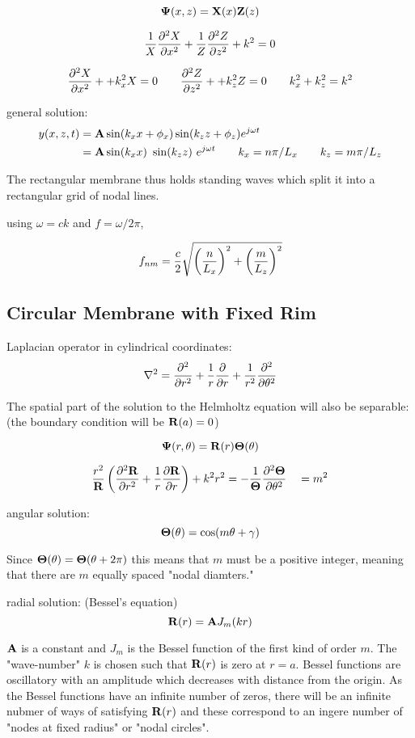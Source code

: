 \documentclass[10pt, a4paper, twocolumn]{article}
\begin{document}
\[ \vb \Psi (x,z) = \vb X (x) \vb Z (z) \] 

\[ \frac1X \pdv[2]{X}{x} + \frac1Z \pdv[2]{Z}{z} + k^2 = 0 \]

\[ \pdv[2]{X}{x} + + k_x^2 X = 0 \qquad \pdv[2]{Z}{z} + + k_z^2 Z = 0 \qquad k_x^2 + k_z^2 = k^2
\]

general solution:
\begin{equation*}
\begin{aligned}
y(x,z,t) &= \vb A \sin (k_x x + \phi _x )
\sin (k_z z + \phi _z ) e^{j \omega t}
\\ &= \vb A \sin (k_x x) \ \sin (k_z z) \ e^{j \omega t}
\qquad k_x = n \pi /L_x \qquad k_z = m \pi / L_z
\end{aligned}
\end{equation*}

The rectangular membrane thus holds standing waves which split it into a rectangular grid of nodal lines.

using $\omega = ck$ and $f = \omega/2 \pi $,

\[ f_{nm} = \frac{c}{2} \sqrt{ \qty(\frac{n}{L_x})^2 +
\qty(\frac{m}{L_z})^2 } \]

\subsection{Circular Membrane with Fixed Rim}

Laplacian operator in cylindrical coordinates:
\[ \laplacian = \pdv[2]{r} + \frac1r \pdv{r} +
\frac{1}{r^2} \pdv[2]{\theta} \]

The spatial part of the solution to the Helmholtz equation will also be separable: (the boundary condition will be $\vb R (a) = 0$)

\[ \vb \Psi (r, \theta) = \vb R (r) \vb \Theta (\theta) \]

\[ \frac{r^2}{\vb R}
\left( \pdv[2]{\vb R}{r} + \frac1r \pdv{\vb R}{r} \right)
+ k^2 r^2
= - \frac{1}{\vb \Theta} \pdv[2]{\vb \Theta}{\theta}
\quad = m^2 \]

angular solution:
\[ \vb \Theta (\theta ) = \cos (m \theta + \gamma ) \]

Since $ \vb \Theta (\theta ) = \vb \Theta (\theta + 2 \pi)$ this means that $m$ must be a positive integer, meaning that there are $m$ equally spaced "nodal diamters."

radial solution: \quad (Bessel's equation)
\[ \vb R (r) = \vb A J_m (kr) \]

$ \vb A $ is a constant and $J_m$ is the Bessel function of the first kind of order $m$. The "wave-number" $k$ is chosen such that $\vb R (r) $ is zero at $r=a$. Bessel functions are oscillatory with an amplitude which decreases with distance from the origin. As the Bessel functions have an infinite number of zeros, there will be an infinite nubmer of ways of satisfying $\vb R (r)$ and these correspond to an ingere number of "nodes at fixed radius" or "nodal circles".
\end{document}
